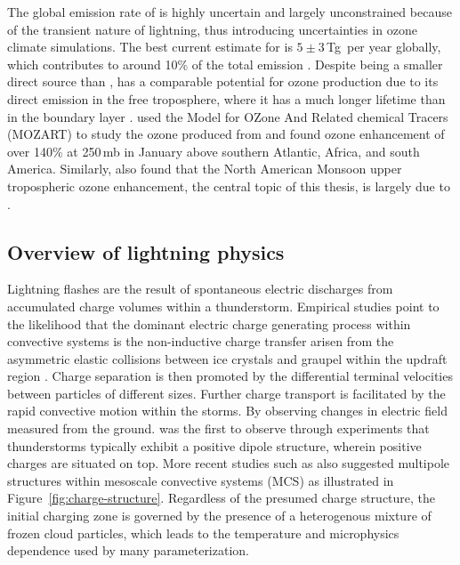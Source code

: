 The global emission rate of {\lnox} is highly uncertain and largely unconstrained because of the transient nature of lightning, thus introducing uncertainties in ozone climate simulations. The best current estimate for {\lnox} is $5\pm3$\,\unit{Tg}\, per year globally, which contributes to around 10\% of the total  emission \citep{Schumann:2007fk}. Despite being a smaller direct source than {\anox}, {\lnox} has a comparable potential for ozone production due to its direct emission in the free troposphere, where it has a much longer lifetime than in the boundary layer \citep[][and references therein]{Lamarque:1996kx,Allen:2000uq,Schumann:2007fk}. \citet{Hauglustaine:2001mi} used the Model for OZone And Related chemical Tracers (MOZART) to study the ozone produced from {\lnox} and found ozone enhancement of over 140\% at 250\,\unit{mb} in January above southern Atlantic, Africa, and south America. Similarly, \citet{Cooper:2007cr} also found that the North American Monsoon upper tropospheric ozone enhancement, the central topic of this thesis, is largely due to {\lnox}.

\subsection{Overview of lightning physics}\label{ssec:intro/lightning/overview}
	

	Lightning flashes are the result of spontaneous electric discharges from accumulated charge volumes within a thunderstorm. Empirical studies point to the likelihood that the dominant electric charge generating process within convective systems is the non-inductive charge transfer arisen from the asymmetric elastic collisions between ice crystals and graupel within the updraft region \citep[and references therein]{Reynolds:1957lq,Jayaratne:1985pd,Saunders:2006gf}. Charge separation is then promoted by the differential terminal velocities between particles of different sizes. Further charge transport is facilitated by the rapid convective motion within the storms. By observing changes in electric field measured from the ground. \citet{Wilson:1916xx} was the first to observe through experiments that thunderstorms typically exhibit a positive dipole structure, wherein positive charges are situated on top. More recent studies such as \citet{Stolzenburg:1998fk} also suggested multipole structures within mesoscale convective systems (MCS) as illustrated in Figure~\ref{fig:charge-structure}. Regardless of the presumed charge structure, the initial charging zone is governed by the presence of a heterogenous mixture of frozen cloud particles, which leads to the temperature and microphysics dependence used by many parameterization.
	
